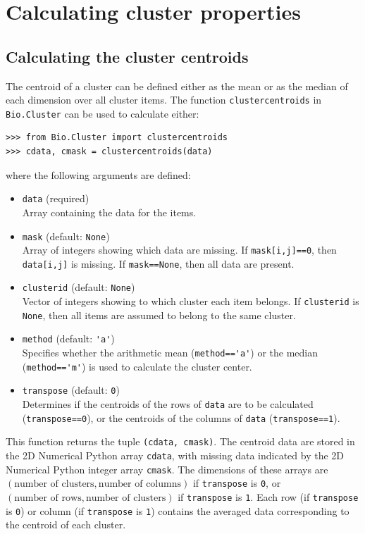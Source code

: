 \documentclass{report}
\begin{document}
\section{Calculating cluster properties}

\subsection*{Calculating the cluster centroids}
\label{subsec:clustercentroids}

The centroid of a cluster can be defined either as the mean or as the median of each dimension over all cluster items. The function \verb|clustercentroids| in \verb|Bio.Cluster| can be used to calculate either:

\begin{verbatim}
>>> from Bio.Cluster import clustercentroids
>>> cdata, cmask = clustercentroids(data)
\end{verbatim}
where the following arguments are defined:
\begin{itemize}
\item \verb|data| (required) \\
Array containing the data for the items.
\item \verb|mask| (default: \verb|None|) \\
Array of integers showing which data are missing. If \verb|mask[i,j]==0|, then \verb|data[i,j]| is missing. If \verb|mask==None|, then all data are present.
\item \verb|clusterid| (default: \verb|None|) \\
Vector of integers showing to which cluster each item belongs. If \verb|clusterid| is \verb|None|, then all items are assumed to belong to the same cluster.
\item \verb|method| (default: \verb|'a'|) \\
Specifies whether the arithmetic mean (\verb|method=='a'|) or the median (\verb|method=='m'|) is used to calculate the cluster center.
\item \verb|transpose| (default: \verb|0|) \\
Determines if the centroids of the rows of \verb|data| are to be calculated (\verb|transpose==0|), or the centroids of the columns of \verb|data| (\verb|transpose==1|).
\end{itemize}

This function returns the tuple \verb|(cdata, cmask)|. The centroid data are stored in the 2D Numerical Python array \verb|cdata|, with missing data indicated by the 2D Numerical Python integer array \verb|cmask|.  The dimensions of these arrays are $\left(\textrm{number of clusters}, \textrm{number of columns}\right)$ if \verb|transpose| is \verb|0|, or $\left(\textrm{number of rows}, \textrm{number of clusters}\right)$ if \verb|transpose| is \verb|1|. Each row (if \verb|transpose| is \verb|0|) or column (if \verb|transpose| is \verb|1|) contains the averaged data corresponding to the centroid of each cluster.
\end{document}
